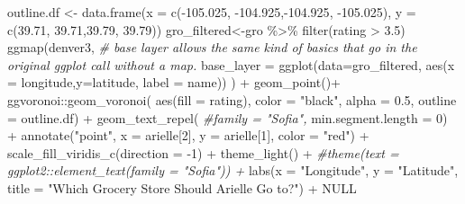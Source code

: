 \documentclass[]{tufte-handout}
\newenvironment{Shaded}{}{}
\newcommand{\AttributeTok}[1]{\textcolor[rgb]{0.49,0.56,0.16}{#1}}
\newcommand{\CommentTok}[1]{\textcolor[rgb]{0.38,0.63,0.69}{\textit{#1}}}
\newcommand{\ConstantTok}[1]{\textcolor[rgb]{0.53,0.00,0.00}{#1}}
\newcommand{\DecValTok}[1]{\textcolor[rgb]{0.25,0.63,0.44}{#1}}
\newcommand{\FloatTok}[1]{\textcolor[rgb]{0.25,0.63,0.44}{#1}}
\newcommand{\FunctionTok}[1]{\textcolor[rgb]{0.02,0.16,0.49}{#1}}
\newcommand{\NormalTok}[1]{#1}
\newcommand{\OtherTok}[1]{\textcolor[rgb]{0.00,0.44,0.13}{#1}}
\newcommand{\SpecialCharTok}[1]{\textcolor[rgb]{0.25,0.44,0.63}{#1}}
\newcommand{\StringTok}[1]{\textcolor[rgb]{0.25,0.44,0.63}{#1}}
\begin{document}
\begin{Shaded}
\begin{Highlighting}[]
\NormalTok{outline.df }\OtherTok{\textless{}{-}} \FunctionTok{data.frame}\NormalTok{(}\AttributeTok{x =} \FunctionTok{c}\NormalTok{(}\SpecialCharTok{{-}}\FloatTok{105.025}\NormalTok{, }\SpecialCharTok{{-}}\FloatTok{104.925}\NormalTok{,}\SpecialCharTok{{-}}\FloatTok{104.925}\NormalTok{, }\SpecialCharTok{{-}}\FloatTok{105.025}\NormalTok{),}
                         \AttributeTok{y =} \FunctionTok{c}\NormalTok{(}\FloatTok{39.71}\NormalTok{, }\FloatTok{39.71}\NormalTok{,}\FloatTok{39.79}\NormalTok{, }\FloatTok{39.79}\NormalTok{))}
\NormalTok{gro\_filtered}\OtherTok{\textless{}{-}}\NormalTok{gro }\SpecialCharTok{\%\textgreater{}\%} 
  \FunctionTok{filter}\NormalTok{(rating }\SpecialCharTok{\textgreater{}} \FloatTok{3.5}\NormalTok{)      }
\FunctionTok{ggmap}\NormalTok{(denver3,}
      \CommentTok{\# base layer allows the same kind of basics that go in the original ggplot call without a map. }
      \AttributeTok{base\_layer =} \FunctionTok{ggplot}\NormalTok{(}\AttributeTok{data=}\NormalTok{gro\_filtered, }\FunctionTok{aes}\NormalTok{(}\AttributeTok{x =}\NormalTok{ longitude,}\AttributeTok{y=}\NormalTok{latitude, }\AttributeTok{label =}\NormalTok{ name)) }
\NormalTok{      ) }\SpecialCharTok{+}
  \FunctionTok{geom\_point}\NormalTok{()}\SpecialCharTok{+}
\NormalTok{  ggvoronoi}\SpecialCharTok{::}\FunctionTok{geom\_voronoi}\NormalTok{(}
    \FunctionTok{aes}\NormalTok{(}\AttributeTok{fill =}\NormalTok{ rating),}
    \AttributeTok{color =} \StringTok{"black"}\NormalTok{, }
    \AttributeTok{alpha =} \FloatTok{0.5}\NormalTok{, }
    \AttributeTok{outline =}\NormalTok{ outline.df) }\SpecialCharTok{+}
  \FunctionTok{geom\_text\_repel}\NormalTok{( }
    \CommentTok{\#family = "Sofia",}
                  \AttributeTok{min.segment.length =} \DecValTok{0}\NormalTok{) }\SpecialCharTok{+}
  \FunctionTok{annotate}\NormalTok{(}\StringTok{"point"}\NormalTok{, }\AttributeTok{x =}\NormalTok{ arielle[}\DecValTok{2}\NormalTok{], }\AttributeTok{y =}\NormalTok{ arielle[}\DecValTok{1}\NormalTok{], }\AttributeTok{color =} \StringTok{"red"}\NormalTok{) }\SpecialCharTok{+}
  \FunctionTok{scale\_fill\_viridis\_c}\NormalTok{(}\AttributeTok{direction =} \SpecialCharTok{{-}}\DecValTok{1}\NormalTok{) }\SpecialCharTok{+} 
  \FunctionTok{theme\_light}\NormalTok{() }\SpecialCharTok{+} 
  \CommentTok{\#theme(text = ggplot2::element\_text(family = "Sofia")) +}
  \FunctionTok{labs}\NormalTok{(}\AttributeTok{x =} \StringTok{"Longitude"}\NormalTok{,}
       \AttributeTok{y =} \StringTok{"Latitude"}\NormalTok{, }
       \AttributeTok{title =} \StringTok{"Which Grocery Store Should Arielle Go to?"}\NormalTok{) }\SpecialCharTok{+} 
  \ConstantTok{NULL}
\end{Highlighting}
\end{Shaded}
\end{document}
